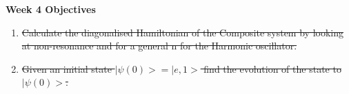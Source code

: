 \documentclass{article}
\begin{document}
\Large{\textbf{Week 4 Objectives}}
\\
\begin{enumerate}
    \item \sout{Calculate the diagonalised Hamiltonian of the Composite system by looking at non-resonance and for a general n for the Harmonic oscillator.}
    \item \sout{Given an initial state $|\psi(0)> = |e,1>$ find the evolution of the state to $|\psi(0)>$.}

\end{enumerate}
\end{document}
